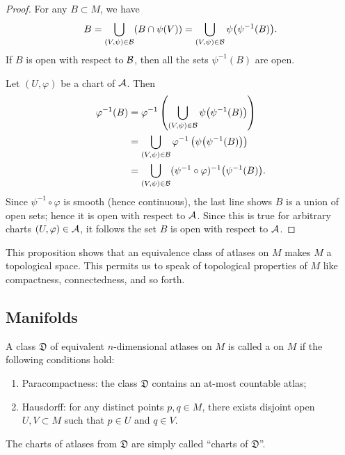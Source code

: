 \begin{proof}
  For any $B\subset M$, we have
  \begin{equation}
B = \bigcup_{(V,\psi)\in\mathcal{B}}(B\cap\psi(V))
  = \bigcup_{(V,\psi)\in\mathcal{B}}\psi\bigl(\psi^{-1}(B)\bigr).
  \end{equation}
If $B$ is open with respect to $\mathcal{B}$, then all the sets
$\psi^{-1}(B)$ are open.

Let $(U,\varphi)$ be a chart of $\mathcal{A}$. Then
\begin{subequations}
\begin{align}
\varphi^{-1}(B)
&=\varphi^{-1}\left(\bigcup_{(V,\psi)\in\mathcal{B}}\psi\bigl(\psi^{-1}(B)\bigr)\right)\\
&= \bigcup_{(V,\psi)\in\mathcal{B}}\varphi^{-1}\left(\psi\bigl(\psi^{-1}(B)\bigr)\right)\\
&= \bigcup_{(V,\psi)\in\mathcal{B}} (\psi^{-1}\circ\varphi)^{-1}\bigl(\psi^{-1}(B)\bigr).
\end{align}
\end{subequations}
Since $\psi^{-1}\circ\varphi$ is smooth (hence continuous), the last
line shows $B$ is a union of open sets; hence it is open with respect to
$\mathcal{A}$. Since this is true for arbitrary charts $(U,\varphi)\in\mathcal{A}$,
it follows the set $B$ is open with respect to $\mathcal{A}$.
\end{proof}

\begin{remark}
This proposition shows that an equivalence class of atlases on $M$ makes
$M$ a topological space. This permits us to speak of topological
properties of $M$ like compactness, connectedness, and so forth.
\end{remark}

\subsection{Manifolds}

\begin{definition}
A class $\mathfrak{D}$ of equivalent $n$-dimensional atlases on $M$ is
called a  on $M$ if the following
conditions hold:
\begin{enumerate}
\item Paracompactness: the class $\mathfrak{D}$ contains an at-most countable atlas;
\item Hausdorff: for any distinct points $p,q\in M$, there exists
  disjoint open $U,V\subset M$ such that $p\in U$ and $q\in V$.
\end{enumerate}
The charts of atlases from $\mathfrak{D}$ are simply called ``charts of $\mathfrak{D}$''.
\end{definition}

